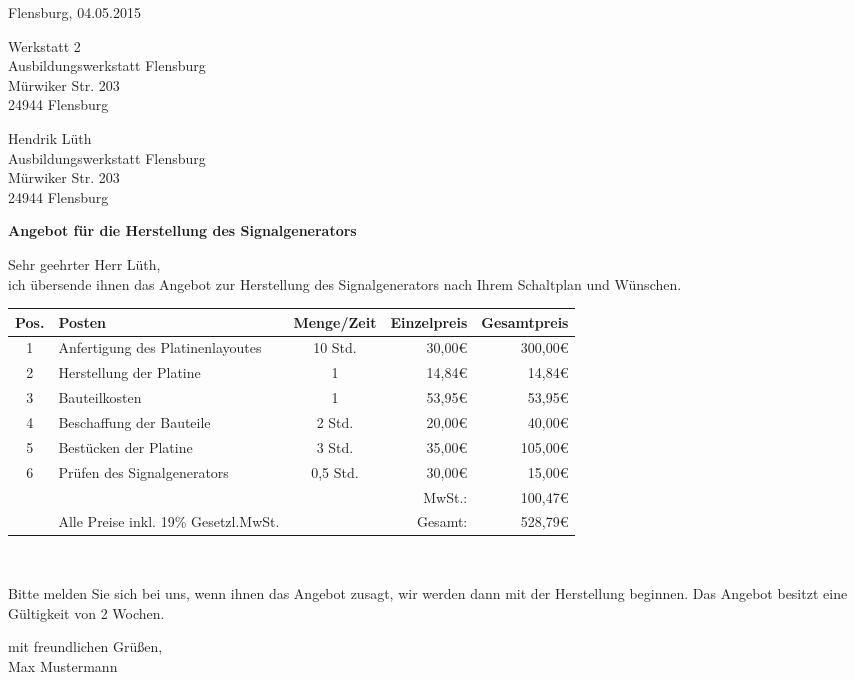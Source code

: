 \pagebreak
Flensburg, 04.05.2015
\begin{flushright}
Werkstatt 2\\
Ausbildungswerkstatt Flensburg\\
Mürwiker Str. 203\\
24944 Flensburg
\end{flushright}
\bigskip
\bigskip
\bigskip
Hendrik Lüth\\
Ausbildungswerkstatt Flensburg\\
Mürwiker Str. 203\\
24944 Flensburg\\
\begin{flushleft}
\bigskip

\textbf{Angebot für die Herstellung des Signalgenerators}
\bigskip
\bigskip

Sehr geehrter Herr Lüth,\\
\bigskip
ich übersende ihnen das Angebot zur Herstellung des Signalgenerators nach Ihrem Schaltplan und Wünschen.\\
\medskip

\begin{tabular}{cp{7cm}cr|r|}
\hline
\multicolumn{1}{|l|}{Pos.} & \multicolumn{1}{l|}{Posten} & \multicolumn{1}{l|}{Menge/Zeit} & Einzelpreis & Gesamtpreis \\ \hline
\multicolumn{1}{|c|}{1} & \multicolumn{1}{l|}{Anfertigung des Platinenlayoutes} & \multicolumn{1}{c|}{10 Std.} & 30,00\euro & 300,00\euro \\ \hline
\multicolumn{1}{|c|}{2} & \multicolumn{1}{l|}{Herstellung der Platine} & \multicolumn{1}{c|}{1} & 14,84\euro & 14,84\euro \\ \hline
\multicolumn{1}{|c|}{3} & \multicolumn{1}{l|}{Bauteilkosten} & \multicolumn{1}{c|}{1} & 53,95\euro & 53,95\euro \\ \hline
\multicolumn{1}{|c|}{4} & \multicolumn{1}{l|}{Beschaffung der Bauteile} & \multicolumn{1}{c|}{2 Std.} & 20,00\euro & 40,00\euro \\ \hline
\multicolumn{1}{|c|}{5} & \multicolumn{1}{l|}{Bestücken der Platine} & \multicolumn{1}{c|}{3 Std.} & 35,00\euro & 105,00\euro \\ \hline
\multicolumn{1}{|c|}{6} & \multicolumn{1}{l|}{Prüfen des Signalgenerators} & \multicolumn{1}{c|}{0,5 Std.} & 30,00\euro & 15,00\euro \\ \hline
 & & & MwSt.: & 100,47\euro \\ \cline{5-5}
                       & Alle Preise inkl. 19\% Gesetzl.MwSt. &                       & Gesamt: & 528,79\euro \\ \cline{5-5} 
\end{tabular}\\
\bigskip

Bitte melden Sie sich bei uns, wenn ihnen das Angebot zusagt, wir werden dann mit der Herstellung beginnen. Das Angebot besitzt eine Gültigkeit von 2 Wochen.
\bigskip

mit freundlichen Grüßen,\\
\bigskip
Max Mustermann
\end{flushleft}

